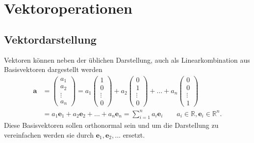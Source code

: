 \section{Vektoroperationen\label{clifford:section:Vektoroperationen}}
\subsection{Vektordarstellung\label{clifford:section:Vektordarstellung}}
Vektoren können neben der üblichen Darstellung, auch als Linearkombination aus Basisvektoren dargestellt werden
\begin{equation}
    \begin{split}
    \textbf{a} 
    &=
    \begin{pmatrix} 
    a_1 \\ a_2 \\ \vdots \\ a_n   
    \end{pmatrix} 
    =
    a_1 \begin{pmatrix}
    1 \\ 0 \\ \vdots \\ 0  
    \end{pmatrix} 
    + 
    a_2\begin{pmatrix} 
    0 \\ 1 \\ \vdots \\ 0  
    \end{pmatrix} + \dots 
    + 
    a_n\begin{pmatrix}
    0 \\ 0 \\ \vdots \\ 1  
    \end{pmatrix} \\\ 
    &= 
    a_1\textbf{e}_1 
    +
    a_2\textbf{e}_2
    + 
    \dots + a_n\textbf{e}_n
    = 
    \sum_{i=1}^{n} a_i \textbf{e}_i
    \qquad
    a_i \in \mathbb{R}
    , \textbf{e}_i \in \mathbb{R}^n.
    \end{split}
\end{equation}
Diese Basisvektoren sollen orthonormal sein und um die Darstellung zu vereinfachen werden sie durch $\textbf{e}_1 , \textbf{e}_2, ...$ ersetzt.
